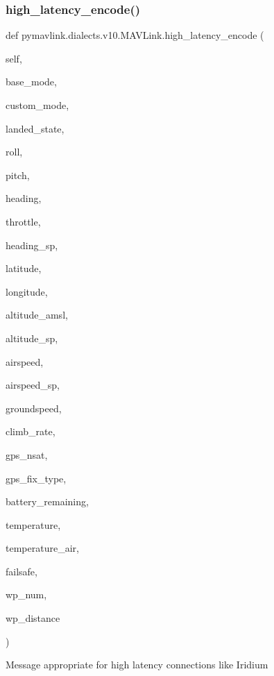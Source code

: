 \begin{DoxyVerb}
\begin{DoxyVerb}
\subsubsection{\texorpdfstring{high\+\_\+latency\+\_\+encode()}{high\_latency\_encode()}}
{\footnotesize\ttfamily def pymavlink.\+dialects.\+v10.\+M\+A\+V\+Link.\+high\+\_\+latency\+\_\+encode (\begin{DoxyParamCaption}\item[{}]{self,  }\item[{}]{base\+\_\+mode,  }\item[{}]{custom\+\_\+mode,  }\item[{}]{landed\+\_\+state,  }\item[{}]{roll,  }\item[{}]{pitch,  }\item[{}]{heading,  }\item[{}]{throttle,  }\item[{}]{heading\+\_\+sp,  }\item[{}]{latitude,  }\item[{}]{longitude,  }\item[{}]{altitude\+\_\+amsl,  }\item[{}]{altitude\+\_\+sp,  }\item[{}]{airspeed,  }\item[{}]{airspeed\+\_\+sp,  }\item[{}]{groundspeed,  }\item[{}]{climb\+\_\+rate,  }\item[{}]{gps\+\_\+nsat,  }\item[{}]{gps\+\_\+fix\+\_\+type,  }\item[{}]{battery\+\_\+remaining,  }\item[{}]{temperature,  }\item[{}]{temperature\+\_\+air,  }\item[{}]{failsafe,  }\item[{}]{wp\+\_\+num,  }\item[{}]{wp\+\_\+distance }\end{DoxyParamCaption})}

\begin{DoxyVerb}Message appropriate for high latency connections like Iridium


\end{DoxyVerb}
\end{DoxyVerb}
\end{DoxyVerb}
